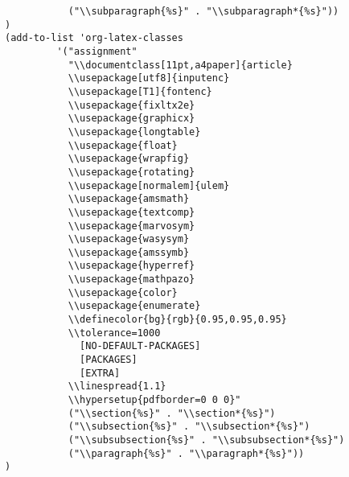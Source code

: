 \documentclass[11pt]{article}
\begin{document}
\begin{verbatim}
	       ("\\subparagraph{%s}" . "\\subparagraph*{%s}"))
)
(add-to-list 'org-latex-classes
	     '("assignment"
	       "\\documentclass[11pt,a4paper]{article}
	       \\usepackage[utf8]{inputenc}
	       \\usepackage[T1]{fontenc}
	       \\usepackage{fixltx2e}
	       \\usepackage{graphicx}
	       \\usepackage{longtable}
	       \\usepackage{float}
	       \\usepackage{wrapfig}
	       \\usepackage{rotating}
	       \\usepackage[normalem]{ulem}
	       \\usepackage{amsmath}
	       \\usepackage{textcomp}
	       \\usepackage{marvosym}
	       \\usepackage{wasysym}
	       \\usepackage{amssymb}
	       \\usepackage{hyperref}
	       \\usepackage{mathpazo}
	       \\usepackage{color}
	       \\usepackage{enumerate}
	       \\definecolor{bg}{rgb}{0.95,0.95,0.95}
	       \\tolerance=1000
		     [NO-DEFAULT-PACKAGES]
		     [PACKAGES]
		     [EXTRA]
	       \\linespread{1.1}
	       \\hypersetup{pdfborder=0 0 0}"
	       ("\\section{%s}" . "\\section*{%s}")
	       ("\\subsection{%s}" . "\\subsection*{%s}")
	       ("\\subsubsection{%s}" . "\\subsubsection*{%s}")
	       ("\\paragraph{%s}" . "\\paragraph*{%s}"))
)
\end{verbatim}
\end{document}
